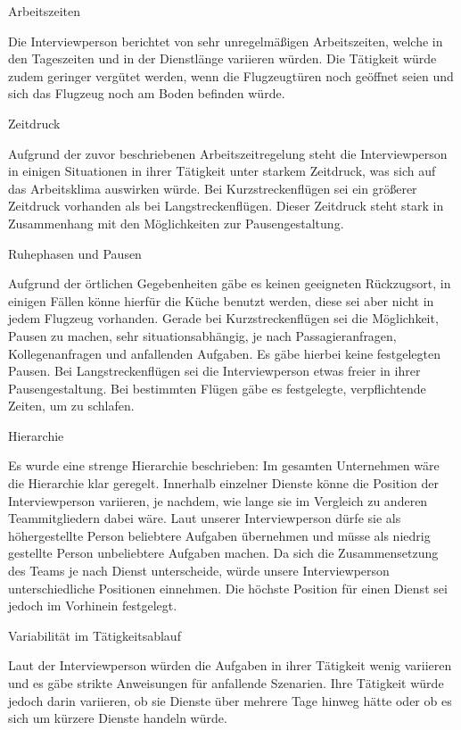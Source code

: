 \documentclass[12pt, a4paper]{article}
\begin{document}
Arbeitszeiten

Die Interviewperson berichtet von sehr unregelmäßigen Arbeitszeiten, welche in den Tageszeiten und in der Dienstlänge variieren würden. Die Tätigkeit würde zudem geringer vergütet werden, wenn die Flugzeugtüren noch geöffnet seien und sich das Flugzeug noch am Boden befinden würde. 

Zeitdruck

Aufgrund der zuvor beschriebenen Arbeitszeitregelung steht die Interviewperson in einigen Situationen in ihrer Tätigkeit unter starkem Zeitdruck, was sich auf das Arbeitsklima auswirken würde. Bei Kurzstreckenflügen sei ein größerer Zeitdruck vorhanden als bei Langstreckenflügen. Dieser Zeitdruck steht stark in Zusammenhang mit den Möglichkeiten zur Pausengestaltung.

Ruhephasen und Pausen

Aufgrund der örtlichen Gegebenheiten gäbe es keinen geeigneten Rückzugsort, in einigen Fällen könne hierfür die Küche benutzt werden, diese sei aber nicht in jedem Flugzeug vorhanden. Gerade bei Kurzstreckenflügen sei die Möglichkeit, Pausen zu machen, sehr situationsabhängig, je nach Passagieranfragen, Kollegenanfragen und anfallenden Aufgaben. Es gäbe hierbei keine festgelegten Pausen. Bei Langstreckenflügen sei die Interviewperson etwas freier in ihrer Pausengestaltung. Bei bestimmten Flügen gäbe es festgelegte, verpflichtende Zeiten, um zu schlafen. 

Hierarchie

Es wurde eine strenge Hierarchie beschrieben: Im gesamten Unternehmen wäre die Hierarchie klar geregelt. Innerhalb einzelner Dienste könne die Position der Interviewperson variieren, je nachdem, wie lange sie im Vergleich zu anderen Teammitgliedern dabei wäre. Laut unserer Interviewperson dürfe sie als höhergestellte Person beliebtere Aufgaben übernehmen und müsse als niedrig gestellte Person unbeliebtere Aufgaben machen. Da sich die Zusammensetzung des Teams je nach Dienst unterscheide, würde unsere Interviewperson unterschiedliche Positionen einnehmen. Die höchste Position für einen Dienst sei jedoch im Vorhinein festgelegt. 

Variabilität im Tätigkeitsablauf

Laut der Interviewperson würden die Aufgaben in ihrer Tätigkeit wenig variieren und es gäbe strikte Anweisungen für anfallende Szenarien. Ihre Tätigkeit würde jedoch darin variieren, ob sie Dienste über mehrere Tage hinweg hätte oder ob es sich um kürzere Dienste handeln würde. 
\end{document}
